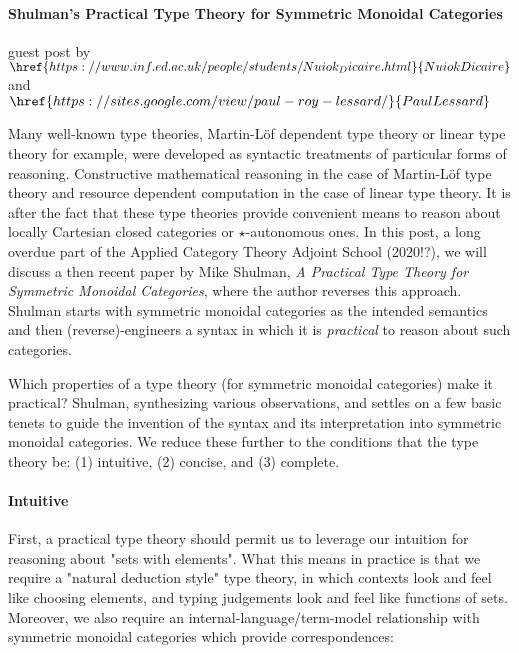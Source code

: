 \documentclass[pra,floatfix,
amsmath,superscriptaddress, 12pt]{article}
\author{Nuiok Dicaire and Paul Lessard}
\date{Elsewhen}
\theoremstyle{definition}
\begin{document}
\paragraph{Shulman's Practical Type Theory for Symmetric Monoidal Categories}

guest post by $\href{https://www.inf.ed.ac.uk/people/students/Nuiok_Dicaire.html}{Nuiok Dicaire}$ and $\href{https://sites.google.com/view/paul-roy-lessard/}{Paul Lessard}$




Many well-known type theories, Martin-L\"{o}f dependent type theory or linear type theory for example, were developed as syntactic treatments of particular forms of reasoning. Constructive mathematical reasoning in the case of Martin-L\"{o}f type theory and resource dependent computation in the case of linear type theory. It is after the fact that these type theories provide convenient means to reason about locally Cartesian closed categories or $\star$-autonomous ones. In this post, a long overdue part of the Applied Category Theory Adjoint School (2020!?), we will discuss a then recent paper by Mike Shulman, 
\textit{A Practical Type Theory for Symmetric Monoidal Categories}, where the author reverses this approach. 
Shulman starts with symmetric monoidal categories as the intended semantics and then (reverse)-engineers a syntax in which it is \emph{practical} to reason about such categories.

\hrulefill

Which properties of a type theory (for symmetric monoidal categories) make it practical? Shulman, synthesizing various observations, and settles on a few basic tenets to guide the invention of the syntax and its interpretation into symmetric monoidal categories. We reduce these further to the conditions that the type theory be: (1) intuitive, (2) concise, and (3) complete.

\paragraph{Intuitive} First, a practical type theory should permit us to leverage our intuition for reasoning about "sets with elements". What this means in practice is that we require a "natural deduction style" type theory, in which contexts look and feel like choosing elements, and typing judgements look and feel like functions of sets. Moreover, we also require an internal-language/term-model relationship with symmetric monoidal categories which provide correspondences:
\end{document}
